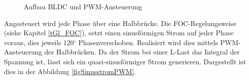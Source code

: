 \begin{figure} [H]
{}
\caption[BLDC Motor]{Aufbau BLDC und PWM-Ansteuerung}
\label{fig:BLDC}
\end{figure}

Angesteuert wird jede Phase über eine Halbbrücke. Die FOC-Regelungsweise (siehe Kapitel \ref{tGl_FOC}), setzt einen sinusförmigen Strom auf jeder Phase voraus, dies jeweils 120\(^\circ\) Phasenverschoben.  Realisiert wird dies mittels PWM-Ansteuerung der Halbbrücken. Da der Strom bei einer L-Last das Integral der Spannung ist, lässt sich ein quasi-sinusförmiger Strom generieren. Dargestellt ist dies in der Abbildung \ref{figSinusstromPWM}.

